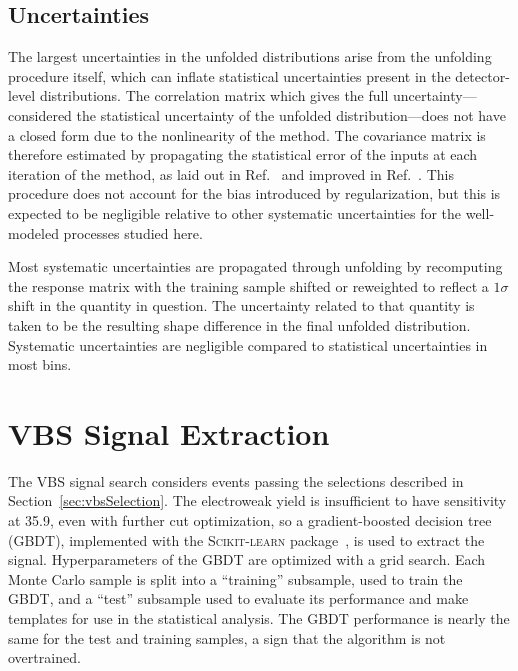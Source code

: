 \subsection{Uncertainties}

The largest uncertainties in the unfolded distributions arise from the unfolding procedure itself, which can inflate statistical uncertainties present in the detector-level distributions.
The correlation matrix which gives the full uncertainty---considered the statistical uncertainty of the unfolded distribution---does not have a closed form due to the nonlinearity of the method.
The covariance matrix is therefore estimated by propagating the statistical error of the inputs at each iteration of the method, as laid out in Ref.~\cite{DAgostini:1994fjx} and improved in Ref.~\cite{Adye:2011gm}.
This procedure does not account for the bias introduced by regularization, but this is expected to be negligible relative to other systematic uncertainties for the well-modeled processes studied here.

Most systematic uncertainties are propagated through unfolding by recomputing the response matrix with the training sample shifted or reweighted to reflect a $1\sigma$ shift in the quantity in question.
The uncertainty related to that quantity is taken to be the resulting shape difference in the final unfolded distribution.
Systematic uncertainties are negligible compared to statistical uncertainties in most bins.


\section{VBS Signal Extraction}

The VBS signal search considers events passing the selections described in Section~\ref{sec:vbsSelection}.
The electroweak yield is insufficient to have sensitivity at 35.9\fbinv, even with further cut optimization, so a gradient-boosted decision tree (GBDT), implemented with the \textsc{Scikit-learn} package~\cite{scikit-learn}, is used to extract the signal.
Hyperparameters of the GBDT are optimized with a grid search.
Each Monte Carlo sample is split into a ``training'' subsample, used to train the GBDT, and a ``test'' subsample used to evaluate its performance and make templates for use in the statistical analysis.
The GBDT performance is nearly the same for the test and training samples, a sign that the algorithm is not overtrained.

